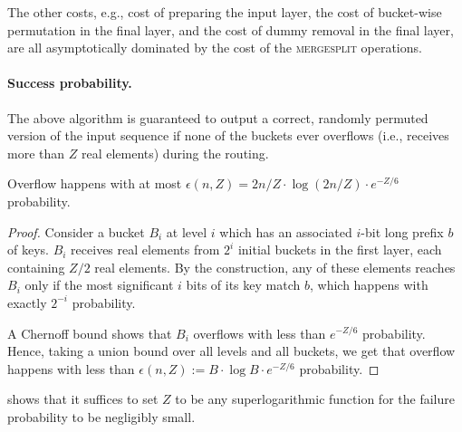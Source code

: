 The other costs, e.g., 
cost of 
preparing the input layer, the cost
of bucket-wise permutation in the final layer,
and the cost of dummy removal in the final layer,
are all asymptotically dominated by the cost
of the \textsc{mergesplit} operations. 


\paragraph{Success probability.} The above algorithm is guaranteed to output a correct, randomly permuted version of the input sequence if none of the buckets ever overflows (i.e., receives more than $Z$ real elements) during the routing.

\begin{lemma}
    Overflow happens  with  at most $\epsilon(n,Z) =2n/Z\cdot\log(2n/Z)\cdot e^{-Z/6}$ probability.
\label{lem:overflow}
\end{lemma}

\begin{proof}
    Consider a bucket $B_i$ at level $i$ which has an associated $i$-bit long prefix $b$ of keys. $B_i$ receives real  elements from $2^i$ initial buckets in the first layer,  each  containing $Z/2$ real  elements. By the construction, any of these elements reaches $B_i$ only if the most significant $i$ bits  of its  key match $b$, which happens with exactly $2^{-i}$ probability. 
    
    A Chernoff bound  shows that $B_i$ overflows  with  less  than $e^{-Z/6}$ probability. Hence, taking a union  bound  over  all  levels and all buckets, we get that overflow happens with less than $\epsilon(n,Z) := B\cdot \log B\cdot e^{-Z/6}$ probability.
\end{proof}

shows that it suffices to set $Z$ to be any superlogarithmic 
function for the failure probability to be negligibly small.
